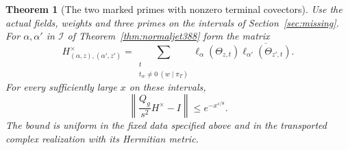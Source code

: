 \documentclass[a4paper,11pt]{article}
\newtheorem{theorem}[proposition]{Theorem}
\theoremstyle{definition}
\theoremstyle{remark}
\numberwithin{equation}{section}
\begin{document}
\begin{theorem}[The two marked primes with nonzero terminal covectors]
\label{thm:terminalmarked390}
Use the actual fields, weights and three primes on the intervals
of Section~\ref{sec:missing}. For \(\alpha,\alpha'\) in
\(\mathcal I\) of Theorem~\ref{thm:normaljet388} form the matrix
\[
  H^\times_{(\alpha,z),(\alpha',z')}
       =\sum_{\substack{t\\ t_w\ne0\ (w\mid\pi_T)}}
         \ell_\alpha(\Theta_{z,t})
                 \overline{\ell_{\alpha'}(\Theta_{z',t})}.
\]
For every sufficiently large \(x\) on these intervals,
\[
          \left\|\frac{Q_g}{s^2}H^\times-I\right\|
                                 \le e^{-x^{\varepsilon/8}} .
\]
The bound is uniform in the fixed data specified above and
in the transported complex realization with its Hermitian metric.
\end{theorem}
\end{document}
